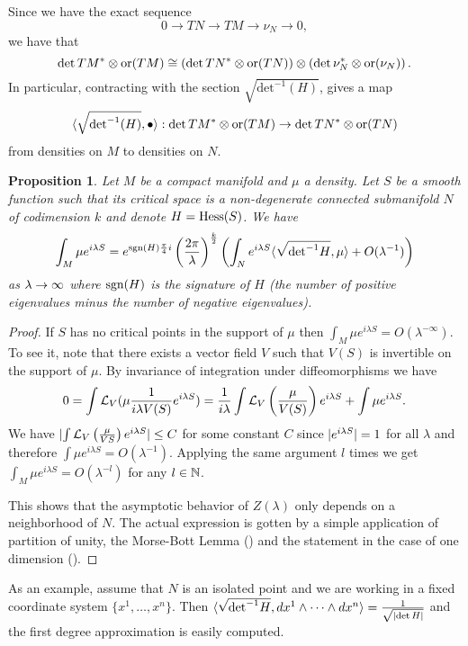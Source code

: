 \documentclass[11pt]{amsart}
\numberwithin{equation}{section}
\numberwithin{figure}{section}
\theoremstyle{plain}
\newtheorem{prop}[thm]{Proposition}
\theoremstyle{definition}
\theoremstyle{remark}
\begin{document}
Since we have the exact sequence 
\[
0\rightarrow TN\rightarrow TM\rightarrow\nu_{N}\rightarrow0,
\]
we have that 
\[
\det TM^{*}\otimes\mathrm{or}(TM)\cong\left(\det TN^{*}\otimes\mathrm{or}(TN)\right)\otimes\left(\det\nu_{N}^{*}\otimes\mathrm{or}(\nu_{N})\right).
\]
In particular, contracting with the section $\sqrt{\mbox{det}^{-1}(H)}$,
gives a map
\[
\langle\sqrt{\mbox{det}^{-1}(H)},\bullet\rangle:\det TM^{*}\otimes\mathrm{or}(TM)\rightarrow\det TN^{*}\otimes\mathrm{or}(TN)
\]
from densities on $M$ to densities on $N$.
\begin{prop}
\label{prop:stationary_phase} Let $M$ be a compact manifold and
$\mu$ a density. Let $S$ be a smooth function such that its critical
space is a non-degenerate connected submanifold $N$ of codimension
$k$ and denote $H=\mathrm{Hess}(S)$. We have 
\[
\int_{M}\mu e^{i\lambda S}=e^{\mathrm{sgn}(H)\frac{\pi}{4}i}\left(\frac{2\pi}{\lambda}\right)^{\frac{k}{2}}\left(\int_{N}e^{i\lambda S}\langle\sqrt{\mbox{det}^{-1}H},\mu\rangle+O(\lambda^{-1})\right)
\]
as $\lambda\rightarrow\infty$ where $\mathrm{sgn}(H)$ is the signature of $H$ (the
number of positive eigenvalues minus the number of negative eigenvalues). \end{prop}
\begin{proof}
If $S$ has no critical points in the support of $\mu$ then $\int_{M}\mu e^{i\lambda S}=O(\lambda^{-\infty})$.
To see it, note that there exists a vector field $V$ such that $V(S)$
is invertible on the support of $\mu$. By invariance of integration
under diffeomorphisms we have 
\[
0=\int\mathcal{L}_{V}(\mu\frac{1}{i\lambda V(S)}e^{i\lambda S})=\frac{1}{i\lambda}\int\mathcal{L}_{V}\left(\frac{\mu}{V(S)}\right)e^{i\lambda S}+\int\mu e^{i\lambda S}.
\]
We have $ $$\lvert\int\mathcal{L}_{V}\left(\frac{\mu}{VS}\right)e^{i\lambda S}\rvert\leq C$
for some constant $C$ since $\lvert e^{i\lambda S}\rvert=1$ for all $\lambda$
and therefore $\int\mu e^{i\lambda S}=O(\lambda^{-1})$. Applying
the same argument $l$ times we get $\int_{M}\mu e^{i\lambda S}=O(\lambda^{-l})$
for any $l\in\mathbb{N}$.

This shows that the asymptotic behavior of $Z(\lambda)$ only depends
on a neighborhood of $N$. The actual expression is gotten by a simple
application of partition of unity, the Morse-Bott Lemma ()
and the statement in the case of one dimension ().
\end{proof}
As an example, assume that $N$ is an isolated point and we are working
in a fixed coordinate system $\{x^{1},\dots,x^{n}\}$. Then $\langle\sqrt{\mbox{det}^{-1}H},dx^{1}\wedge\dots\wedge dx^{n}\rangle=\frac{1}{\sqrt{\lvert\det H\rvert}}$
and the first degree approximation is easily computed.
\end{document}

